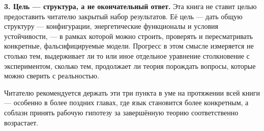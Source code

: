 \documentclass[11pt,oneside]{book}
\begin{document}
\bigskip
\noindent\textbf{3. Цель — структура, а не окончательный ответ.}
Эта книга не ставит целью предоставить читателю закрытый набор результатов. Её цель — дать общую структуру — конфигурации, энергетические функционалы и условия устойчивости, — в рамках которой можно строить, проверять и пересматривать конкретные, фальсифицируемые модели. Прогресс в этом смысле измеряется не столько тем, выдерживает ли то или иное отдельное уравнение столкновение с экспериментом, сколько тем, продолжает ли теория порождать вопросы, которые можно сверить с реальностью.

\bigskip
\noindent Читателю рекомендуется держать эти три пункта в уме на протяжении всей книги — особенно в более поздних главах, где язык становится более конкретным, а соблазн принять рабочую гипотезу за завершённую теорию соответственно возрастает.

\tableofcontents

\mainmatter


\end{document}

